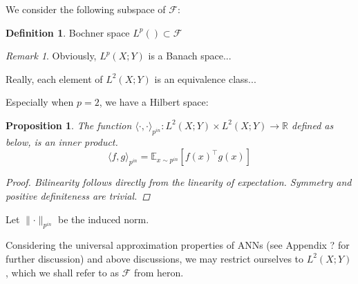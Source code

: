 \documentclass{article}
\theoremstyle{plain}
\newtheorem{proposition}[theorem]{Proposition}
\theoremstyle{definition}
\newtheorem{definition}[theorem]{Definition}
\theoremstyle{remark}
\newtheorem{remark}{Remark}
\begin{document}
We consider the following subspace of $\mathcal{F}$:
\begin{definition}
	Bochner space $L^p() \subset \mathcal{F}$
\end{definition}
\begin{remark}
	Obviously, $L^p(X; Y)$ is a Banach space...
	
	Really, each element of $L^2(X; Y)$ is an equivalence class...
\end{remark}

Especially when $p = 2$, we have a Hilbert space:
\begin{proposition}
	The function $\langle \cdot, \cdot \rangle_{p^{in}} : L^2(X; Y) \times L^2(X; Y) \rightarrow \mathbb{R}$ defined as below, is an inner product.
	\begin{equation}
		\langle f, g \rangle_{p^{in}} = \mathbb{E}_{x \sim p^{in}} \left[ f(x)^\intercal g(x) \right]
	\end{equation}
	\begin{proof}
		Bilinearity follows directly from the linearity of expectation.
		Symmetry and positive definiteness are trivial.
	\end{proof}
\end{proposition}

Let $\lVert \cdot \rVert_{p^{in}}$ be the induced norm.

Considering the universal approximation properties of ANNs (see Appendix ? for further discussion) and above discussions, we may restrict ourselves to $L^2(X; Y)$, which we shall refer to as $\mathcal{F}$ from heron.
\end{document}
